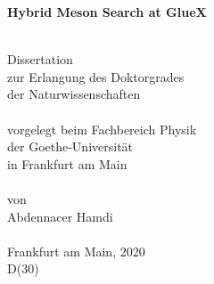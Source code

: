 
\begin{titlepage}
\thispagestyle{empty}

\begin{center}
{\huge\bf Hybrid Meson Search at GlueX}
\par
\mbox{}\\[1.5cm]
{\large Dissertation\\
zur Erlangung des Doktorgrades\\
der Naturwissenschaften}\\
\mbox{}\\[1.5cm]
{\large vorgelegt beim Fachbereich Physik\\
der Goethe-Universit\"at \\
in Frankfurt am Main}\\
\mbox{}\\[1.5cm]
{\large von}\\
\vspace{3mm}
{\large Abdennacer Hamdi}\\
\mbox{}\\[1.5cm]
{\large Frankfurt am Main, 2020}\\
\vspace{4mm}
{\large D(30)}
\end{center}

\newpage
\thispagestyle{empty}
\end{titlepage}